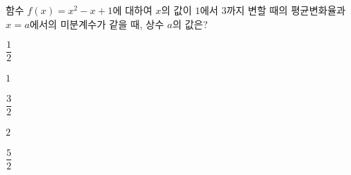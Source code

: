 함수 $f(x)=x^2-x+1$에 대하여 $x$의 값이 $1$에서 $3$까지 변할 때의 평균변화율과 $x=a$에서의 미분계수가 같을 때, 상수 $a$의 값은?
\begin{choices32}{\rule[-3ex]{0pt}{8ex}$\dfrac{1}{2}$}{\rule[-3ex]{0pt}{8ex}$1$}{\rule[-3ex]{0pt}{8ex}$\dfrac{3}{2}$}{\rule[-3ex]{0pt}{8ex}$2$}{\rule[-3ex]{0pt}{8ex}$\dfrac{5}{2}$}\end{choices32}
